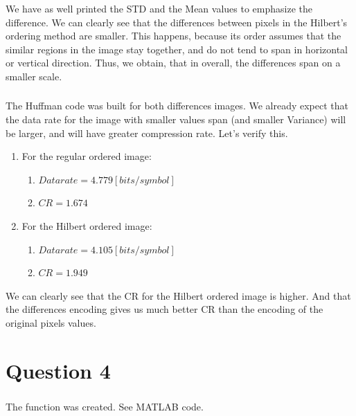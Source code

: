 \documentclass[a4paper]{iacas}
\begin{document}
We have as well printed the STD and the Mean values to emphasize the difference. We can clearly see that the differences between pixels in the Hilbert's ordering method are smaller. This happens, because its order assumes that the similar regions in the image stay together, and do not tend to span in horizontal or vertical direction. Thus, we obtain, that in overall, the differences span on a smaller scale.


\subsubsection{}
The Huffman code was built for both differences images. We already expect that the data rate for the image with smaller values span (and smaller Variance) will be larger, and will have greater compression rate. Let's verify this.

\begin{enumerate}
\item For the regular ordered image:
	\begin{enumerate}
	\item $Data rate = 4.779 [bits/symbol]$
	\item $CR = 1.674$
	\end{enumerate}
\item For the Hilbert ordered image:
	\begin{enumerate}
	\item $Data rate = 4.105 [bits/symbol]$
	\item $CR = 1.949$
	\end{enumerate}
\end{enumerate}

We can clearly see that the CR for the Hilbert ordered image is higher. And that the differences encoding gives us much better CR than the encoding of the original pixels values.













\newpage
\section{Question 4}

\subsubsection{}
The function was created. See MATLAB code.
\end{document}
